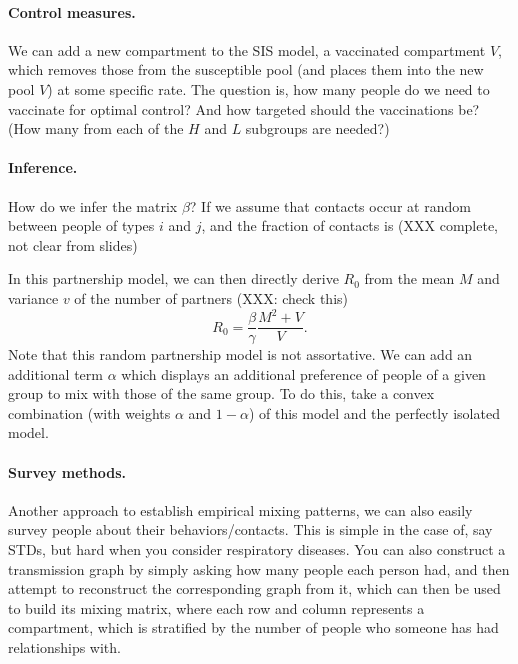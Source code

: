 \documentclass[12pt]{article}
\begin{document}
\paragraph{Control measures.} We can add a new compartment to the SIS model, a vaccinated compartment $V$, which removes those from the susceptible pool (and places them into the new pool $V$) at some specific rate. The question is, how many people do we need to vaccinate for optimal control? And how targeted should the vaccinations be? (How many from each of the $H$ and $L$ subgroups are needed?)

\paragraph{Inference.} How do we infer the matrix $\beta$? If we assume that contacts occur at random between people of types $i$ and $j$, and the fraction of contacts is (XXX complete, not clear from slides)

In this partnership model, we can then directly derive $R_0$ from the mean $M$ and variance $v$ of the number of partners (XXX: check this)
\[
R_0 = \frac{\beta}{\gamma}\frac{M^2 + V}{V}.
\]
Note that this random partnership model is not assortative. We can add an additional term $\alpha$ which displays an additional preference of people of a given group to mix with those of the same group. To do this, take a convex combination (with weights $\alpha$ and $1-\alpha$) of this model and the perfectly isolated model.

\paragraph{Survey methods.} Another approach to establish empirical mixing patterns, we can also easily survey people about their behaviors/contacts. This is simple in the case of, say STDs, but hard when you consider respiratory diseases. You can also construct a transmission graph by simply asking how many people each person had, and then attempt to reconstruct the corresponding graph from it, which can then be used to build its mixing matrix, where each row and column represents a compartment, which is stratified by the number of people who someone has had relationships with.
\end{document}

